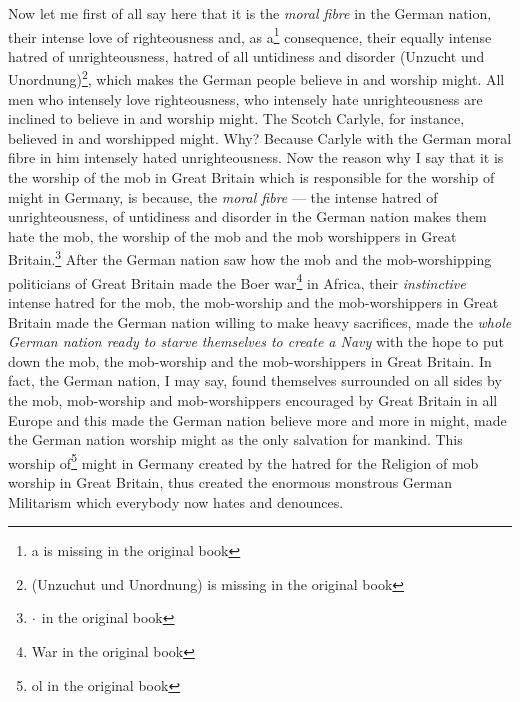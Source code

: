 Now let me first of all say here that it is the \emph{moral fibre} in the German nation, their intense love of righteousness and, as a\footnote{a is missing in the original book} consequence, their equally intense hatred of unrighteousness, hatred of all untidiness and disorder (Unzucht und Unordnung)\footnote{(Unzuchut und Unordnung) is missing in the original book}, which makes the German people believe in and worship might.
All men who intensely love righteousness, who intensely hate unrighteousness are inclined to believe in and worship might.
The Scotch Carlyle, for instance, believed in and worshipped might.
Why?
Because Carlyle with the German moral fibre in him intensely hated unrighteousness.
Now the reason why I say that it is the worship of the mob in Great Britain which is responsible for the worship of might in Germany, is because, the \emph{moral fibre} --- the intense hatred of unrighteousness, of untidiness and disorder in the German nation makes them hate the mob, the worship of the mob and the mob worshippers in Great Britain.\footnote{$\huge\cdot$ in the original book} 
After the German nation saw how the mob and the mob-worshipping politicians of Great Britain made the Boer war\footnote{War in the original book} in Africa, their \emph{instinctive} intense hatred\cite{num3} for the mob, the mob-worship and the mob-worshippers in Great Britain made the German nation willing to make heavy sacrifices, made the \emph{whole German nation ready to starve themselves to create a Navy} with the hope to put down the mob, the mob-worship and the mob-worshippers in Great Britain.
In fact, the German nation, I may say, found themselves surrounded on all sides by the mob, mob-worship and mob-worshippers encouraged by Great Britain in all Europe and this made the German nation believe more and more in might, made the German nation worship might as the only salvation for mankind.
This worship of\footnote{ol in the original book} might in Germany created by the hatred for the Religion of mob worship in Great Britain, thus created the enormous monstrous German Militarism which everybody now hates and denounces.

